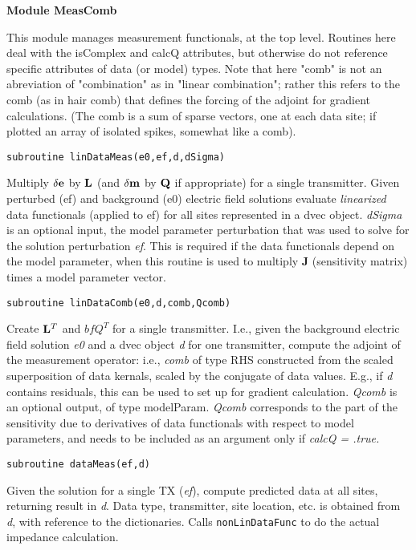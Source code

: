 \documentclass[12pt]{article}
\begin{document}
\noindent
{\bf Module MeasComb}

This module manages measurement functionals,
at the top level.  Routines here deal with the
isComplex and calcQ attributes, but otherwise
do not reference specific attributes of data (or
model) types.  Note that here "comb" is not
an abreviation of "combination" as in "linear combination";
rather this refers to the comb (as in hair comb) that
defines the forcing of the adjoint for gradient
calculations.  (The comb is a sum of sparse vectors,
one at each data site; if plotted an array of isolated
spikes, somewhat like a comb).

\begin{verbatim}
subroutine linDataMeas(e0,ef,d,dSigma)
\end{verbatim}

Multiply $\delta {\bf e}$ by $\bf L$ (and $\delta {\bf m}$ by
$\bf Q$ if appropriate) for a single transmitter.
Given perturbed (ef) and  background (e0) electric field solutions
evaluate {\it linearized} data functionals (applied to ef)
for all sites represented in a dvec object.  
{\it dSigma} is an optional input, the model parameter perturbation 
that was used to solve for the solution perturbation {\it ef}.  This is
required if the data functionals depend on the model parameter, when
this routine is used to multiply {\bf J} (sensitivity matrix) times
a model parameter vector.

\begin{verbatim}
subroutine linDataComb(e0,d,comb,Qcomb)
\end{verbatim}

Create ${\bf L}^T$ and ${bf Q}^T$ for a single transmitter.
I.e., given the background electric field solution {\it e0}
and a dvec object {\it d} for one transmitter, compute the adjoint
of the measurement operator: i.e., {\it comb} of type
RHS constructed from the scaled
superposition of data kernals, scaled by the conjugate of data values.
E.g., if {\it d} contains residuals, this can be used to set up for
gradient calculation.  {\it Qcomb} is an optional output, of type
modelParam.  {\it Qcomb} corresponds to the part of the sensitivity due 
to derivatives of data functionals with respect to model parameters,
and needs to be included as an argument only if {\it calcQ = .true.}

\begin{verbatim}
subroutine dataMeas(ef,d)
\end{verbatim}

Given the solution for a single TX ({\it ef}), compute predicted data
at all sites, returning result in {\it d}.
Data type, transmitter, site location, etc. is obtained from
{\it d}, with reference to the dictionaries.
Calls \verb|nonLinDataFunc| to do the actual impedance calculation.
\end{document}
